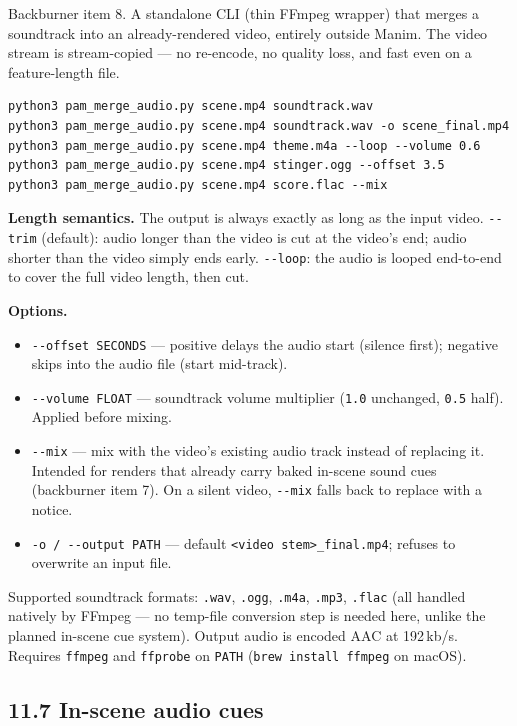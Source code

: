 \documentclass[
  11pt,
]{book}
\begin{document}
Backburner item 8. A standalone CLI (thin FFmpeg wrapper) that merges
a soundtrack into an already-rendered video, entirely outside Manim.
The video stream is stream-copied --- no re-encode, no quality loss,
and fast even on a feature-length file.

\begin{verbatim}
python3 pam_merge_audio.py scene.mp4 soundtrack.wav
python3 pam_merge_audio.py scene.mp4 soundtrack.wav -o scene_final.mp4
python3 pam_merge_audio.py scene.mp4 theme.m4a --loop --volume 0.6
python3 pam_merge_audio.py scene.mp4 stinger.ogg --offset 3.5
python3 pam_merge_audio.py scene.mp4 score.flac --mix
\end{verbatim}

\textbf{Length semantics.} The output is always exactly as long as
the input video. \texttt{-{}-trim} (default): audio longer than the
video is cut at the video's end; audio shorter than the video simply
ends early. \texttt{-{}-loop}: the audio is looped end-to-end to cover
the full video length, then cut.

\textbf{Options.}

\begin{itemize}
\item
  \texttt{-{}-offset\ SECONDS} --- positive delays the audio start
  (silence first); negative skips into the audio file (start
  mid-track).
\item
  \texttt{-{}-volume\ FLOAT} --- soundtrack volume multiplier
  (\texttt{1.0} unchanged, \texttt{0.5} half). Applied before mixing.
\item
  \texttt{-{}-mix} --- mix with the video's existing audio track
  instead of replacing it. Intended for renders that already carry
  baked in-scene sound cues (backburner item 7). On a silent video,
  \texttt{-{}-mix} falls back to replace with a notice.
\item
  \texttt{-o\ /\ -{}-output\ PATH} --- default
  \texttt{\textless{}video\ stem\textgreater{}\_final.mp4}; refuses to
  overwrite an input file.
\end{itemize}

Supported soundtrack formats: \texttt{.wav}, \texttt{.ogg},
\texttt{.m4a}, \texttt{.mp3}, \texttt{.flac} (all handled natively by
FFmpeg --- no temp-file conversion step is needed here, unlike the
planned in-scene cue system). Output audio is encoded AAC at
192\,kb/s. Requires \texttt{ffmpeg} and \texttt{ffprobe} on
\texttt{PATH} (\texttt{brew\ install\ ffmpeg} on macOS).

\subsection{\texorpdfstring{11.7 In-scene audio
cues}{11.7 In-scene audio cues}}\label{in-scene-audio-cues}
\end{document}
